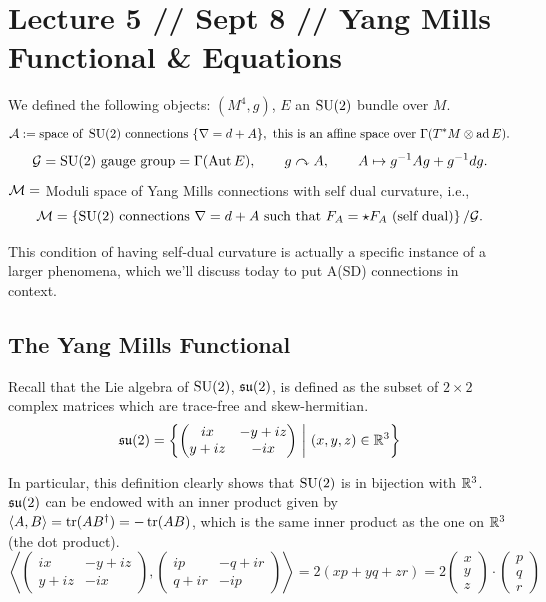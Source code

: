\documentclass[main]{subfiles}
\begin{document}
\section*{Lecture 5 // Sept 8 // Yang Mills Functional \& Equations}

\begin{recall}
We defined the following objects: $(M^4,g)$, $E$ an $\operatorname{SU}(2)$ bundle over $M$.
\[
\mathcal{A} := \text{space of } \operatorname{SU}(2) \text{ connections } \{\nabla=d+A\}, \text{ this is an affine space over } \Gamma(T^\ast M\otimes \operatorname{ad} E).
\]
\[
\mathcal{G} = \operatorname{SU}(2) \text{ gauge group} = \Gamma(\operatorname{Aut} E), \qquad g\curvearrowright A, \qquad A\mapsto g^{-1}Ag+g^{-1}dg.
\]
$\mathcal{M} = $ Moduli space of Yang Mills connections with self dual curvature, i.e.,
\[
\mathcal{M} = \left\{\operatorname{SU}(2) \text{ connections } \nabla=d+A \text{ such that } F_A=\star F_A \ (\text{self dual})\right\}/\mathcal{G}.
\]

This condition of having self-dual curvature is actually a specific instance of a larger phenomena, which we'll discuss today to put A(SD) connections in context.
\end{recall}

\subsection*{The Yang Mills Functional}

Recall that the Lie algebra of $\operatorname{SU}(2)$, $\mathfrak{su}(2)$, is defined as the subset of $2\times 2$ complex matrices which are trace-free and skew-hermitian.
\[
\mf{su}(2) = \left\{\begin{pmatrix} ix & -y+iz \\ y+iz & -ix\end{pmatrix} \ \middle|\ (x,y,z)\in\RR^3\right\}
\]

In particular, this definition clearly shows that $\operatorname{SU}(2)$ is in bijection with $\mathbb R^3$. $\mathfrak{su}(2)$ can be endowed with an inner product given by $\langle A,B\rangle = \operatorname{tr}(AB^\dagger) = -\operatorname{tr}(AB)$, which is the same inner product as the one on $\mathbb R^3$ (the dot product).
\[
\left\langle \begin{pmatrix} ix & -y+iz \\ y+iz & -ix\end{pmatrix}, \begin{pmatrix} ip & -q+ir \\ q+ir & -ip\end{pmatrix}\right\rangle = 2(xp+yq+zr) = 2\begin{pmatrix}x\\y\\z\end{pmatrix}\cdot\begin{pmatrix}p\\q\\r\end{pmatrix}
\]
\end{document}
